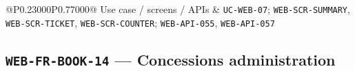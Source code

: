 \begin{longtable}{@{}P{0.23000\SRSWidth}P{0.77000\SRSWidth}@{}}
Use case /\allowbreak{} screens /\allowbreak{} APIs & \texttt{UC-\allowbreak{}WEB-\allowbreak{}07}; \texttt{WEB-\allowbreak{}SCR-\allowbreak{}SUMMARY}, \texttt{WEB-\allowbreak{}SCR-\allowbreak{}TICKET}, \texttt{WEB-\allowbreak{}SCR-\allowbreak{}COUNTER}; \texttt{WEB-\allowbreak{}API-\allowbreak{}055}, \texttt{WEB-\allowbreak{}API-\allowbreak{}057} \\[3pt]
\end{longtable}
\endgroup

\subsection{\texttt{WEB-\allowbreak{}FR-\allowbreak{}BOOK-\allowbreak{}14} — Concessions administration}
\begingroup
\fontsize{9.5}{12}\selectfont
\setlength{\SRSWidth}{\dimexpr\linewidth-2\tabcolsep\relax}
